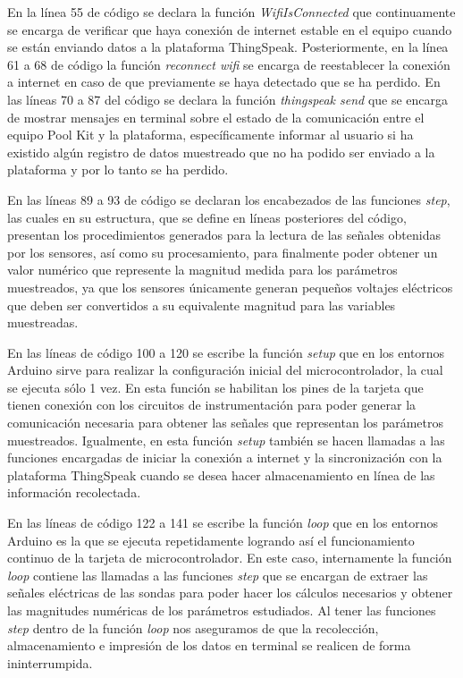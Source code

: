 En la línea 55 de código se declara la función \textit{WifiIsConnected} que continuamente se encarga de verificar que haya conexión de internet estable en el equipo cuando se están enviando datos a la plataforma ThingSpeak.
Posteriormente, en la línea 61 a 68 de código la función \textit{reconnect wifi} se encarga de reestablecer la conexión a internet en caso de que previamente se haya detectado que se ha perdido. En las líneas 70 a 87 del 
código se declara la función \textit{thingspeak send} que se encarga de mostrar mensajes en terminal sobre el estado de la comunicación entre el equipo Pool Kit y la plataforma, específicamente informar al usuario si ha 
existido algún registro de datos muestreado que no ha podido ser enviado a la plataforma y por lo tanto se ha perdido.

En las líneas 89 a 93 de código se declaran los encabezados de las funciones \textit{step}, las cuales en su estructura, que se define en líneas posteriores del código, presentan los procedimientos generados para la lectura 
de las señales obtenidas por los sensores, así como su procesamiento, para finalmente poder obtener un valor numérico que represente la magnitud medida para los parámetros muestreados, ya que los sensores únicamente generan
pequeños voltajes eléctricos que deben ser convertidos a su equivalente magnitud para las variables muestreadas.

En las líneas de código 100 a 120 se escribe la función \textit{setup} que en los entornos Arduino sirve para realizar la configuración inicial del microcontrolador, la cual se ejecuta sólo 1 vez. En esta función se habilitan 
los pines de la tarjeta que tienen conexión con los circuitos de instrumentación para poder generar la comunicación necesaria para obtener las señales que representan los parámetros muestreados. Igualmente, en esta función 
\textit{setup} también se hacen llamadas a las funciones encargadas de iniciar la conexión a internet y la sincronización con la plataforma ThingSpeak cuando se desea hacer almacenamiento en línea de las información recolectada.

En las líneas de código 122 a 141 se escribe la función \textit{loop} que en los entornos Arduino es la que se ejecuta repetidamente logrando así el funcionamiento continuo de la tarjeta de microcontrolador. En este caso, 
internamente la función \textit{loop} contiene las llamadas a las funciones \textit{step} que se encargan de extraer las señales eléctricas de las sondas para poder hacer los cálculos necesarios y obtener las magnitudes 
numéricas de los parámetros estudiados. Al tener las funciones \textit{step} dentro de la función \textit{loop} nos aseguramos de que la recolección, almacenamiento e impresión de los datos en terminal se realicen de forma 
ininterrumpida.

